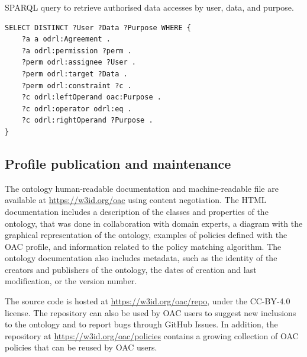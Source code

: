 \begin{listing}[ht]
\caption{SPARQL query to retrieve authorised data accesses by user, data, and purpose.}
\label{list:sparql_agreement}
\begin{verbatim}
SELECT DISTINCT ?User ?Data ?Purpose WHERE {
    ?a a odrl:Agreement .
    ?a odrl:permission ?perm .
    ?perm odrl:assignee ?User .
    ?perm odrl:target ?Data .
    ?perm odrl:constraint ?c .
    ?c odrl:leftOperand oac:Purpose .
    ?c odrl:operator odrl:eq .
    ?c odrl:rightOperand ?Purpose .
}
\end{verbatim}
\end{listing}

\subsection{Profile publication and maintenance}
\label{sec:oac_publication}

The ontology human-readable documentation and machine-readable file are available at \url{https://w3id.org/oac} using content negotiation.
The HTML documentation includes a description of the classes and properties of the ontology, that was done in collaboration with domain experts, a diagram with the graphical representation of the ontology, examples of policies defined with the OAC profile, and information related to the policy matching algorithm.
The ontology documentation also includes metadata, such as the identity of the creators and publishers of the ontology, the dates of creation and last modification, or the version number.

The source code is hosted at \url{https://w3id.org/oac/repo}, under the CC-BY-4.0 license.
The repository can also be used by OAC users to suggest new inclusions to the ontology and to report bugs through GitHub Issues.
In addition, the repository at \url{https://w3id.org/oac/policies} contains a growing collection of OAC policies that can be reused by OAC users.